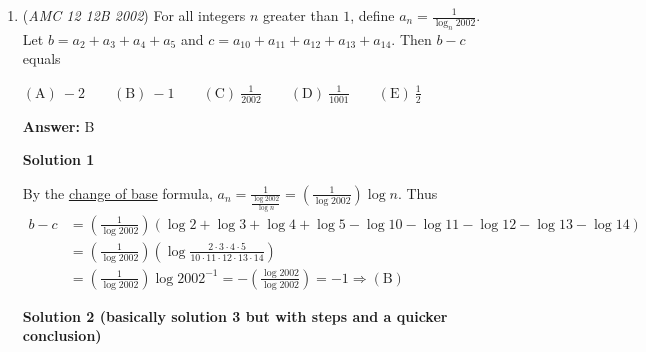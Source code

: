 \begin{enumerate}
\textbf{Solution 2}

Find the LCMs of the groups of the numbers.

 Notice that the groups are relatively prime.

 So $a_n=$:

 11 if $n$ is a multiple of 182.

 13 if $n$ is a multiple of 154.

 14 if $n$ is a multiple of 143.

 When do we see ambiguities (for example: $n$ is a multiple of 11, 13, and 14)? This is only done when $n$ is a multiple of $\operatorname{lcm}(11,13,14)=2002$. However, since $n<2002$, this can never happen.

 So we have 10 multiples of 182 we have to count (1 to 10 $*182$), and similarly, 12 multiples of 154, and 13 multiples of 143. The sum is $10*11+12*13+13*14=448$. Select $\boxed{A}$.

 


	\item (\textit{AMC 12 12B 2002}) For all integers $n$ greater than $1$, define $a_n = \frac{1}{\log_n 2002}$. Let $b = a_2 + a_3 + a_4 + a_5$ and $c = a_{10} + a_{11} + a_{12} + a_{13} + a_{14}$. Then $b- c$ equals


 $\mathrm{(A)}\ -2 \qquad\mathrm{(B)}\ -1  \qquad\mathrm{(C)}\ \frac{1}{2002} \qquad\mathrm{(D)}\ \frac{1}{1001} \qquad\mathrm{(E)}\ \frac 12$

 \textbf{Answer: }B



\textbf{Solution 1}

By the \href{https://artofproblemsolving.com/wiki/index.php?title=Logarithms\#Logarithmic\_Properties}{change of base} formula, $a_n = \frac{1}{\frac{\log 2002}{\log n}} = \left(\frac{1}{\log 2002}\right) \log n$. Thus 
 \begin{align*}b- c &= \left(\frac{1}{\log 2002}\right)(\log 2 + \log 3 + \log 4 + \log 5 - \log 10 - \log 11 - \log 12 - \log 13 - \log 14)\\ &= \left(\frac{1}{\log 2002}\right)\left(\log \frac{2 \cdot 3 \cdot 4 \cdot 5}{10 \cdot 11 \cdot 12 \cdot 13 \cdot 14}\right)\\  &= \left(\frac{1}{\log 2002}\right) \log 2002^{-1} = -\left(\frac{\log 2002}{\log 2002}\right) = -1 \Rightarrow \mathrm{(B)}\end{align*}





\textbf{Solution 2 (basically solution 3 but with steps and a quicker conclusion)}


\end{enumerate}
